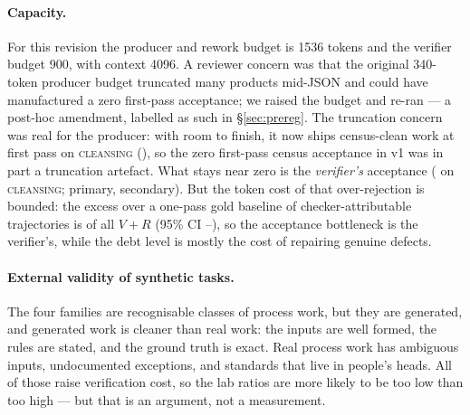 \documentclass[11pt]{article}
\newcommand{\VV}{\ensuremath{V}}
\newcommand{\RV}{\ensuremath{R}}
\newcommand{\famname}[1]{\textsc{#1}}
\begin{document}
\paragraph{Capacity.} For this revision the producer and rework budget is 1536 tokens and the
verifier budget 900, with context 4096. A reviewer concern was that the original 340-token producer
budget truncated many products mid-JSON and could have manufactured a zero first-pass acceptance;
we raised the budget and re-ran --- a post-hoc amendment, labelled as such in \S\ref{sec:prereg}.
The truncation concern was real for the producer: with room to finish, it now ships census-clean
work at first pass on \famname{cleansing} (\VDCleansePass{}), so the zero first-pass census
acceptance in v1 was in part a truncation artefact. What stays near zero is the \emph{verifier's}
acceptance (\VDCleanseVerAcc{} on \famname{cleansing}; \VDqBaseAcc{} primary, \VDlBaseAcc{}
secondary). But the token cost of that over-rejection is bounded: the excess over a one-pass gold
baseline of checker-attributable trajectories is \VDchkShare{} of all $\VV+\RV$ (95\% CI
\VDchkShareLo--\VDchkShareHi), so the acceptance
bottleneck is the verifier's, while the debt level is mostly the cost of repairing genuine defects.

\paragraph{External validity of synthetic tasks.} The four families are recognisable classes of
process work, but they are generated, and generated work is cleaner than real work: the inputs are
well formed, the rules are stated, and the ground truth is exact. Real process work has ambiguous
inputs, undocumented exceptions, and standards that live in people's heads. All of those raise
verification cost, so the lab ratios are more likely to be too low than too high --- but that is
an argument, not a measurement.
\end{document}
